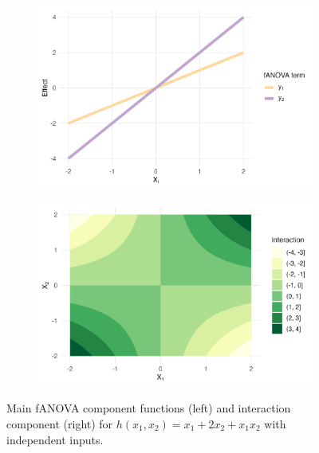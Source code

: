 \begin{figure}[htpb]
    \centering
    \begin{subfigure}[t]{0.49\textwidth}
        \centering
        \includegraphics[width=\textwidth]{images/experiment_section/running_example_a1p10_a2p20_a11p00_a22p00_a12p10_rhop00_main.png}
    \end{subfigure}%
    \hfill
    \begin{subfigure}[t]{0.49\textwidth}
        \centering
        \includegraphics[width=\textwidth]{images/experiment_section/running_example_a1p10_a2p20_a11p00_a22p00_a12p10_rhop00_interaction.png}
    \end{subfigure}
    \caption{Main fANOVA component functions (left) and interaction component (right) for $h(x_1, x_2) = x_1 + 2 x_2 + x_1 x_2$ with independent inputs.}
    \label{fig:running_ex_independent}
\end{figure}

